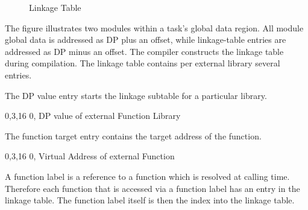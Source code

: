 \begin{figure}[H]
\begin{center}
\end{center} 
\caption{Linkage Table} 
\label{fig: Linkage Table} 
\end{figure}

The figure illustrates two modules within a task's global data region. All module global data is addressed as DP plus an offset, while linkage-table entries are addressed as DP minus an offset. The compiler constructs the linkage table during compilation. The linkage table contains per external library several entries. 

The DP value entry starts the linkage subtable for a particular library. 

\begin{center}
    \drawInstrFormatSixtyFour
       {0,3,16}
        {0, DP value of external Function Library}
\end{center}

The function target entry contains the target address of the function.

\begin{center}
    \drawInstrFormatSixtyFour
       {0,3,16}
        {0, Virtual Address of external Function}
\end{center}



A function label is a reference to a function which is resolved at calling time. Therefore each function that is accessed via a function label has an entry in the linkage table. The function label itself is then the index into the linkage table. 

